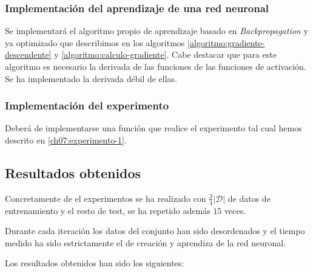\subsubsection{Implementación del aprendizaje de una red neuronal} 
Se implementará el algoritmo propio de aprendizaje basado en \textit{Backpropagation} y ya optimizado 
que describimos en los algoritmos \ref{algoritmo:gradiente-descendente} y \ref{algoritmo:calculo-gradiente}.
Cabe destacar que para este algoritmo es necesario la derivada de las funciones de las funciones de activación. Se ha implementado la derivada débil de ellas. 

\subsubsection{Implementación del experimento} 
Deberá de implementarse una función que realice el 
experimento tal cual hemos descrito en \ref{ch07:experimento-1}.

\subsection{Resultados obtenidos}

Concretamente de el experimentos se ha realizado con $\frac{3}{4}|\mathcal{D}|$ de datos de entrenamiento 
y el resto de test, se ha repetido además $15$ veces. 

Durante cada iteración los datos del conjunto han sido desordenados y el tiempo medido ha sido estrictamente el de creación y aprendiza de la red neuronal. 

Los resultados obtenidos han sido los siguientes: 

\begin{table}[H]
    \centering
    \caption{Tiempos en segundos hasta parada empleado por cada algoritmo en las sucesivas iteraciones }
\end{table}



